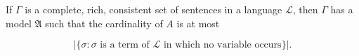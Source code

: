 If $\Gamma$ is a complete, rich, consistent set of sentences in a language $\mathcal{L}$, then $\Gamma$ has a model $\mathfrak{A}$ such that the cardinality of $A$ is at most

$$|\{\sigma : \sigma \text{ is a term of } \mathcal{L} \text{ in which no variable occurs}\}|.$$
